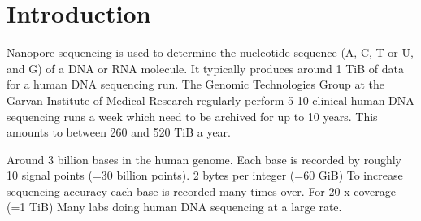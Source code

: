 \chapter{Introduction}



Nanopore sequencing is used to determine the nucleotide sequence (A, C, T or U, and G) of a DNA or RNA molecule.
It typically produces around 1 TiB of data for a human DNA sequencing run.
The Genomic Technologies Group at the Garvan Institute of Medical Research regularly perform 5-10 clinical human DNA sequencing runs a week which need to be archived for up to 10 years. This amounts to between 260 and 520 TiB a year.

Around 3 billion bases in the human genome.
Each base is recorded by roughly 10 signal points (=30 billion points).
2 bytes per integer (=60 GiB)
To increase sequencing accuracy each base is recorded many times over. For 20 x coverage (=1 TiB)
Many labs doing human DNA sequencing at a large rate.
